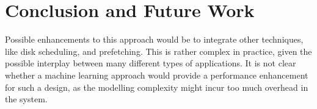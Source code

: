 \section{Conclusion and Future Work}

Possible enhancements to this approach would be to integrate other techniques,
like disk scheduling, and prefetching.  This is rather complex in practice,
given the possible interplay between many different types of applications.  It
is not clear whether a machine learning approach would provide a performance
enhancement for such a design, as the modelling complexity might incur too much
overhead in the system.
